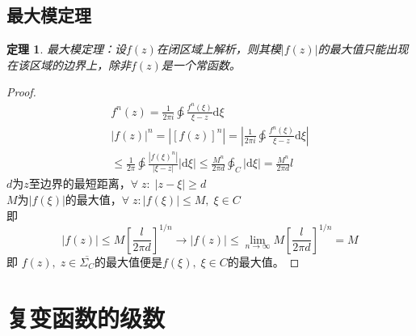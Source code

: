\documentclass[10pt, a4paper, oneside]{ctexbook}
\newtheorem{theorem}{定理}[section]
\def\D{\mathrm{d}}
\newcommand{\F}[1][z]
{\ensuremath{f(#1)}}
\begin{document}
\section{最大模定理}
\begin{theorem}
    最大模定理：设$\F$在闭区域上解析，则其模$|\F|$的最大值只能出现在该区域的边界上，除非$\F$是一个常函数。
\end{theorem}
\begin{proof}
    \begin{align*}
        f^n(z)=\frac{1}{2\pi i} \ointctrclockwise \frac{f^n(\xi)}{\xi-z}\D \xi\\
        |\F|^n=|\left[\F\right]^n|=\left|\frac{1}{2\pi i} \ointctrclockwise \frac{f^n(\xi)}{\xi-z}\D \xi\right| \\ \le \frac{1}{2\pi} \ointctrclockwise \frac{|f(\xi)^n|}{|\xi-z|}|\D \xi|
        \le \frac{M^n}{2\pi d}\ointctrclockwise_C |\D \xi|=\frac{M^n}{2\pi d}l
    \end{align*}
    $d$为$z$至边界的最短距离，$\forall\; z:\;|z-\xi|\ge d$\\
    $M$为$|\F[\xi]|$的最大值，$\forall\; z:|f(\xi)|\le M,\;\xi\in C$\\
    即
    $$
    |\F|\le M\left[\frac{l}{2\pi d}\right]^{1/n}\to|\F|\le \lim_{n\to \infty} M\left[\frac{l}{2\pi d}\right]^{1/n}=M
    $$
    即
    $f(z),\;z\in \overline{\Sigma_C}$的最大值便是$f(\xi),\;\xi\in C$的最大值。
\end{proof}
\chapter{复变函数的级数}
\end{document}

